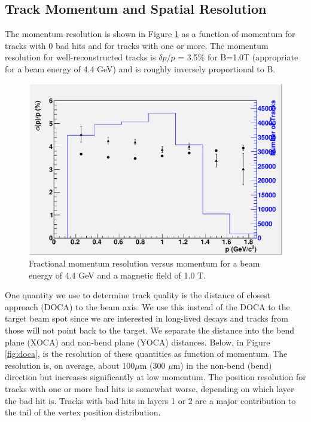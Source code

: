 \subsection{Track Momentum and Spatial Resolution}

The momentum resolution is shown in Figure \ref{fig:trkmom} as a function of momentum for tracks with 
0 bad hits and for tracks with one or more.  The momentum resolution for well-reconstructed 
tracks is $\delta p/p$ = 3.5\% for B=1.0T (appropriate for a beam energy of 4.4 GeV) and is roughly inversely proportional to B.  


\begin{figure}
\includegraphics[scale=0.8]{performance/tracking_performance/momResvsMom.pdf}
\caption{  Fractional momentum resolution versus momentum for a beam energy of 4.4 GeV and a magnetic field of 1.0 T. } 
\label{fig:trkmom}
\end{figure}


One quantity we use to determine track quality is the distance of closest approach (DOCA) 
to the beam axis.  We use this instead of the DOCA to the target beam spot since we are 
interested in long-lived decays and tracks from those will not point back to the target. 
We separate the distance into the bend plane (XOCA) and non-bend plane (YOCA) distances.  
Below, in Figure \ref{fig:doca}, is the resolution of these quantities as function of momentum.  
The resolution is, on average, about 100$\mu$m (300 $\mu$m) 
in the non-bend (bend) direction but increases significantly at low momentum.  The position 
resolution for tracks with one or more bad hits is somewhat worse, depending on which layer 
the bad hit is.  Tracks with bad hits in 
layers 1 or 2 are a major contribution to the tail of the vertex position distribution. 
    
